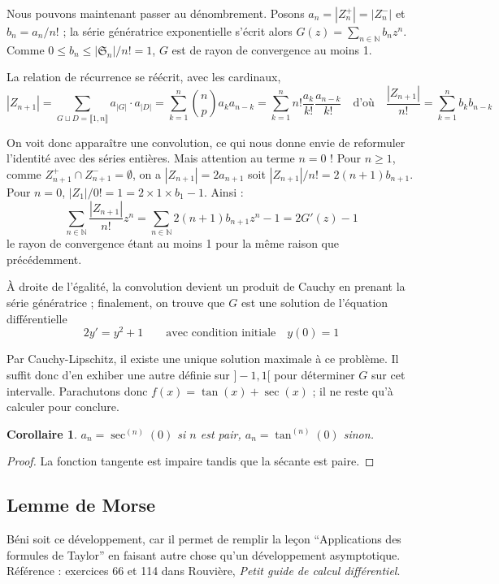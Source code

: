 \documentclass[a4paper, 11pt]{article}
\def\N{\mathbb{N}}
\def\Sigmap{\mathfrak{S}}
\newtheorem*{corollary}{Corollaire}
\begin{document}
Nous pouvons maintenant passer au dénombrement. Posons $a_n = |Z_n^+| = |Z_n^-|$
et $b_n = a_n/n!$ ; la série génératrice exponentielle s'écrit alors $G(z) =
\sum_{n \in \N} b_n z^n$. Comme $0 \leq b_n \leq |\Sigmap_n| / n! = 1$, $G$ est
de rayon de convergence au moins 1.

La relation de récurrence se réécrit, avec les cardinaux,
\[ |Z_{n+1}| = \sum_{G \sqcup D = \llbracket 1,n \rrbracket} a_{|G|} \cdot
  a_{|D|} = \sum_{k = 1}^n \binom{n}{p} a_k a_{n-k}
  = \sum_{k = 1}^n n! \frac{a_k}{k!} \frac{a_{n-k}}{k!} \quad \text{d'où} \quad
  \frac{|Z_{n+1}|}{n!} = \sum_{k = 1}^n b_k b_{n-k}
\]

On voit donc apparaître une convolution, ce qui nous donne envie de reformuler
l'identité avec des séries entières. Mais attention au terme $n = 0$ ! Pour $n
\geq 1$, comme $Z_{n+1}^+ \cap Z_{n+1}^- = \emptyset$, on a $|Z_{n+1}| =
2a_{n+1}$ soit $|Z_{n+1}|/n! = 2(n+1)b_{n+1}$. Pour $n = 0$, $|Z_1|/0! = 1 =
2 \times 1 \times b_1 - 1$. Ainsi :
\[ \sum_{n \in \N} \frac{|Z_{n+1}|}{n!}z^n = \sum_{n \in \N} 2(n+1)b_{n+1}z^n - 1
  = 2G'(z) - 1
\]
le rayon de convergence étant au moins 1 pour la même raison que précédemment.

À droite de l'égalité, la convolution devient un produit de Cauchy en prenant la
série génératrice ; finalement, on trouve que $G$ est une solution de l'équation
différentielle
\[ 2y' = y^2 + 1 \qquad \text{avec condition initiale} \quad y(0) = 1 \]

Par Cauchy-Lipschitz, il existe une unique solution maximale à ce problème. Il
suffit donc d'en exhiber une autre définie sur $]-1,1[$ pour déterminer $G$ sur
cet intervalle. Parachutons donc $f(x) = \tan(x) + \sec(x)$ ; il ne reste qu'à
calculer pour conclure.


\begin{corollary}
  $a_n = \sec^{(n)}(0)$ si $n$ est pair, $a_n = \tan^{(n)}(0)$ sinon.
\end{corollary}
\begin{proof}
  La fonction tangente est impaire tandis que la sécante est paire.
\end{proof}

\newpage

\subsection{Lemme de Morse}

Béni soit ce développement, car il permet de remplir la leçon
\enquote{Applications des formules de Taylor} en faisant autre chose qu'un
développement asymptotique. Référence : exercices 66 et 114 dans Rouvière,
\emph{Petit guide de calcul différentiel}.
\end{document}
